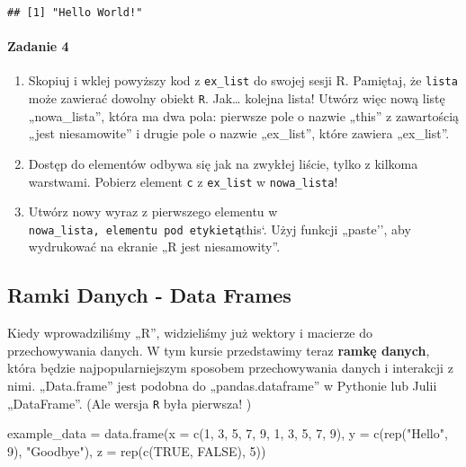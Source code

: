 \documentclass[
]{article}
\newenvironment{Shaded}{\begin{snugshade}}{\end{snugshade}}
\newcommand{\AttributeTok}[1]{\textcolor[rgb]{0.77,0.63,0.00}{#1}}
\newcommand{\ConstantTok}[1]{\textcolor[rgb]{0.00,0.00,0.00}{#1}}
\newcommand{\DecValTok}[1]{\textcolor[rgb]{0.00,0.00,0.81}{#1}}
\newcommand{\FunctionTok}[1]{\textcolor[rgb]{0.00,0.00,0.00}{#1}}
\newcommand{\NormalTok}[1]{#1}
\newcommand{\OtherTok}[1]{\textcolor[rgb]{0.56,0.35,0.01}{#1}}
\newcommand{\StringTok}[1]{\textcolor[rgb]{0.31,0.60,0.02}{#1}}
\providecommand{\tightlist}{%
  \setlength{\itemsep}{0pt}\setlength{\parskip}{0pt}}
\begin{document}
\begin{verbatim}
## [1] "Hello World!"
\end{verbatim}

\hypertarget{zadanie-4}{%
\paragraph{Zadanie 4}\label{zadanie-4}}

\begin{enumerate}
\def\labelenumi{\arabic{enumi}.}
\tightlist
\item
  Skopiuj i wklej powyższy kod z \texttt{ex\_list} do swojej sesji R.
  Pamiętaj, że \texttt{lista} może zawierać dowolny obiekt \texttt{R}.
  Jak\ldots{} kolejna lista! Utwórz więc nową listę „nowa\_lista'',
  która ma dwa pola: pierwsze pole o nazwie „this'' z zawartością „jest
  niesamowite'' i drugie pole o nazwie „ex\_list'', które zawiera
  „ex\_list''.
\item
  Dostęp do elementów odbywa się jak na zwykłej liście, tylko z kilkoma
  warstwami. Pobierz element \texttt{c} z \texttt{ex\_list} w
  \texttt{nowa\_lista}!
\item
  Utwórz nowy wyraz z pierwszego elementu w
  \texttt{nowa\_lista\textquotesingle{},\ elementu\ pod\ etykietą}this`.
  Użyj funkcji „paste'', aby wydrukować na ekranie „R jest
  niesamowity''.
\end{enumerate}

\hypertarget{dataframes}{%
\subsection{Ramki Danych - Data Frames}\label{dataframes}}

Kiedy wprowadziliśmy „R'', widzieliśmy już wektory i macierze do
przechowywania danych. W tym kursie przedstawimy teraz \textbf{ramkę
danych}, która będzie najpopularniejszym sposobem przechowywania danych
i interakcji z nimi. „Data.frame'' jest podobna do „pandas.dataframe'' w
Pythonie lub Julii „DataFrame''. (Ale wersja \texttt{R} była pierwsza! )

\begin{Shaded}
\begin{Highlighting}[]
\NormalTok{example\_data }\OtherTok{=} \FunctionTok{data.frame}\NormalTok{(}\AttributeTok{x =} \FunctionTok{c}\NormalTok{(}\DecValTok{1}\NormalTok{, }\DecValTok{3}\NormalTok{, }\DecValTok{5}\NormalTok{, }\DecValTok{7}\NormalTok{, }\DecValTok{9}\NormalTok{, }\DecValTok{1}\NormalTok{, }\DecValTok{3}\NormalTok{, }\DecValTok{5}\NormalTok{, }\DecValTok{7}\NormalTok{, }\DecValTok{9}\NormalTok{),}
                          \AttributeTok{y =} \FunctionTok{c}\NormalTok{(}\FunctionTok{rep}\NormalTok{(}\StringTok{"Hello"}\NormalTok{, }\DecValTok{9}\NormalTok{), }\StringTok{"Goodbye"}\NormalTok{),}
                          \AttributeTok{z =} \FunctionTok{rep}\NormalTok{(}\FunctionTok{c}\NormalTok{(}\ConstantTok{TRUE}\NormalTok{, }\ConstantTok{FALSE}\NormalTok{), }\DecValTok{5}\NormalTok{))}
\end{Highlighting}
\end{Shaded}
\end{document}
